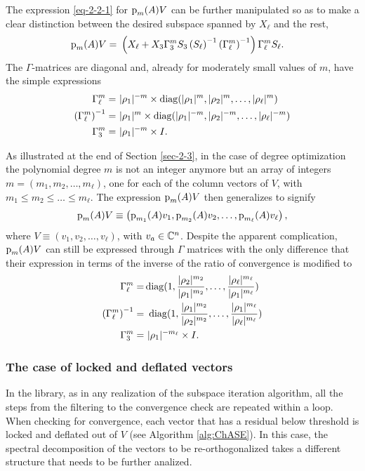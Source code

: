 The expression \eqref{eq-2-2-1} for ${\textrm p}_{m} (A) V$ can be further manipulated so as to make a clear distinction between the desired subspace spanned by $X_\ell$ and the rest,
\begin{eqnarray}
\label{eq-2-2-2}
\pl (A) V = %
&\ \left(X_\ell + X_3 \Gamma_3^m S_3 \inv{S_\ell} \inv{\Gamma_\ell^m}\right)\Gamma_\ell^m S_\ell.
\end{eqnarray}
The $\Gamma$-matrices are diagonal and, already for moderately small values of $m$, have the simple expressions
\begin{eqnarray}
\label{eq:gammas}
\Gamma_\ell^{m}  =&\ |\rho_{1}|^{-m} \times \mathop\mathrm{diag}\nolimits (|\rho_{1}|^{m}, |\rho_{2}|^{m}, \dots, |\rho_{\ell}|^{m}) \nonumber \\ 
\left(\Gamma_\ell^{m}\right)^{-1}  =&\ |\rho_{1}|^{m} \times \mathop\mathrm{diag}\nolimits (|\rho_{1}|^{-m}, |\rho_{2}|^{-m}, \dots, |\rho_{\ell}|^{-m}) \\
\Gamma_3^{m} =&\ |\rho_{1}|^{-m} \times I. \nonumber
\end{eqnarray}

As illustrated at the end of Section \ref{sec-2-3}, in the case of degree optimization the polynomial degree $m$ is not an integer anymore but an array of integers $ m = (m_1, m_2, \dots, m_\ell)$, one for each of the column vectors of $V$, with $m_1\leq m_2 \leq \dots \leq m_\ell$. The expression ${\textrm p}_{m} (A)V$ then generalizes to signify
\[
{\textrm p}_{m} (A)V \equiv \left( {\textrm p}_{m_1} (A) v_1, {\textrm p}_{m_2} (A) v_2, \dots , {\textrm p}_{m_\ell}(A) v_\ell \right),
\]
where $V \equiv (v_1, v_2, \dots , v_\ell)$, with $v_a \in \mathbb{C}^n$. Despite the apparent complication, ${\textrm p}_{m} (A)V$ can still be expressed through $\Gamma$ matrices with the only difference that their expression in terms of the inverse of the ratio of convergence is modified to
\begin{eqnarray}
\label{eq:gammas-2}
\Gamma_\ell^{m}  =& \mathop\mathrm{diag}\nolimits (1, \frac{|\rho_{2}|^{m_2}}{|\rho_{1}|^{m_2}}, \dots, \frac{|\rho_{\ell}|^{m_\ell}}{|\rho_{1}|^{m_\ell}}) \nonumber \\ 
\left(\Gamma_\ell^{m}\right)^{-1}  =&\ \mathop\mathrm{diag}\nolimits (1, \frac{|\rho_{1}|^{m_2}}{|\rho_{2}|^{m_2}}, \dots, \frac{|\rho_{1}|^{m_\ell}}{|\rho_{\ell}|^{m_\ell}}) \\
\Gamma_3^{m} =&\ |\rho_{1}|^{-m_\ell} \times I. \nonumber
\end{eqnarray}

\subsubsection{The case of locked and deflated vectors}
In the \csi library, as in any realization of the subspace iteration algorithm, all the steps from the filtering to the convergence check are repeated within a loop. When checking for convergence, each vector that has a residual below threshold is locked and deflated out of $V$ (see Algorithm \ref{alg:ChASE}). In this case, the spectral decomposition of the vectors to be re-orthogonalized takes a different structure that needs to be further analized.

